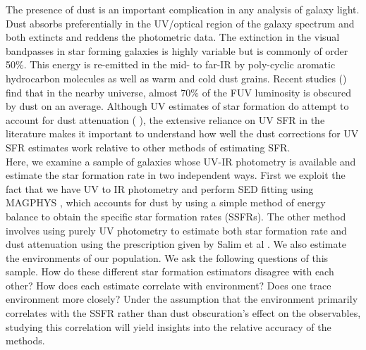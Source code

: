 The presence of dust is an important complication in any analysis of galaxy light. Dust absorbs preferentially in the UV/optical region of the galaxy spectrum and both extincts and reddens the photometric data. The extinction in the visual bandpasses in star forming galaxies is highly variable but is commonly of order 50\%. This energy is re-emitted in the mid- to far-IR by poly-cyclic aromatic hydrocarbon molecules as well as warm and cold dust grains. Recent studies (\citealt{burgarella_herschel_2013}) find that in the nearby universe, almost $70\%$ of the FUV luminosity is obscured by dust on an average. Although UV estimates of star formation do attempt to account for dust attenuation (\citet{salim_uv_2007-1} ), the extensive reliance on UV SFR in the literature \citep[\emph{e.g.}][among others]{peng_mass_2010, moustakas_primus_2013, karim_star_2011, lee_comparison_2009, wyder_uvoptical_2007} makes it important to understand how well the dust corrections for UV SFR estimates work relative to other methods of estimating SFR.\\

Here, we examine a sample of galaxies whose UV-IR photometry is available and estimate the star formation rate in two independent ways. First we exploit the fact that we have UV to IR photometry and perform SED fitting using MAGPHYS \citep{da_cunha_simple_2008}, which accounts for dust by using a simple method of energy balance to obtain the specific star formation rates (SSFRs). The other method involves using purely UV photometry to estimate both star formation rate and dust attenuation using the prescription given by Salim et al \citep{salim_uv_2007-1}. We also estimate the environments of our population. We ask the following questions of this sample. How do these different star formation estimators disagree with each other? How does each estimate correlate with environment? Does one trace environment more closely? Under the assumption that the environment primarily correlates with the SSFR rather than dust obscuration's effect on the observables, studying this correlation will yield insights into the relative accuracy of the methods.\\


